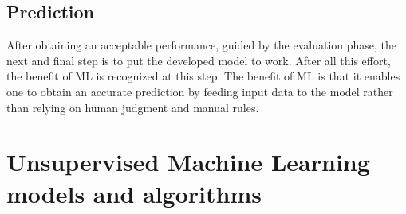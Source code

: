 \subsection{Prediction}

After obtaining an acceptable performance, guided by the evaluation phase, the next and final step is to put the developed model to work. After all this effort, the benefit of \gls{ML} is recognized at this step. The benefit of \gls{ML} is that it enables one to obtain an accurate prediction by feeding input data to the model rather than relying on human judgment and manual rules.

\section{Unsupervised Machine Learning models and algorithms}

